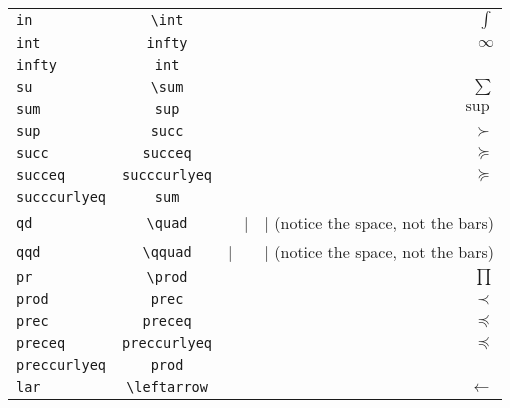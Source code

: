 \documentclass[a4paper,11pt]{scrartcl}
\numberwithin{equation}{section}
\begin{document}
\begin{table}[tb]
\begin{center}
\begin{tabular}{lcr}
    \verb|in|                                  &    \verb|\int|                               &    $\int$  \\
    \verb|int|                                 &    \verb|infty|                              &    $\infty$  \\
    \verb|infty|                               &    \verb|int|                                &    $\mbox{}$  \\
    \verb|su|                                  &    \verb|\sum|                               &    $\sum$  \\
    \verb|sum|                                 &    \verb|sup|                                &    $\sup$  \\
    \verb|sup|                                 &    \verb|succ|                               &    $\succ$  \\
    \verb|succ|                                &    \verb|succeq|                             &    $\succeq$  \\
    \verb|succeq|                              &    \verb|succcurlyeq|                        &    $\succcurlyeq$  \\
    \verb|succcurlyeq|                         &    \verb|sum|                                &    $\mbox{}$  \\
    \verb|qd|                                  &    \verb|\quad|                              &    $|\quad|$  \tiny{(notice the space, not the bars)}  \\
    \verb|qqd|                                 &    \verb|\qquad|                             &    $|\qquad|$  \tiny{(notice the space, not the bars)}  \\
    \verb|pr|                                  &    \verb|\prod|                              &    $\prod$  \\
    \verb|prod|                                &    \verb|prec|                               &    $\prec$  \\
    \verb|prec|                                &    \verb|preceq|                             &    $\preceq$  \\
    \verb|preceq|                              &    \verb|preccurlyeq|                        &    $\preccurlyeq$  \\
    \verb|preccurlyeq|                         &    \verb|prod|                               &    $\mbox{}$  \\
    \verb|lar|                                 &    \verb|\leftarrow|                         &    $\leftarrow$  \\

\end{tabular}
\end{center}
\end{table}
\end{document}
